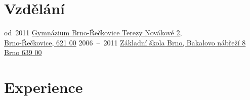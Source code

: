 \documentclass[letterpaper]{twentysecondcv} %
\begin{document}
\makeprofile %

\section{Vzdělání}

\begin{twenty} %
	\twentyitem
    	{od~2011}
        {}
        {}
        {\href{https://www.gyrec.cz/}{Gymnázium Brno-Řečkovice Terezy Novákové 2,\\ Brno-Řečkovice, 621 00}}
        {}
	\twentyitem
    	{2006~--~2011}
        {}
        {}
        {\href{https://www.bakalka.cz/}{Základní škola Brno, Bakalovo nábřeží 8 Brno 639 00}}
        {}
\end{twenty}




\section{Experience}
\end{document}
